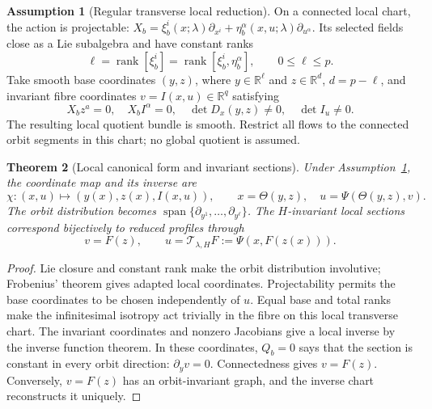 \documentclass[11pt]{article}
\newtheorem{theorem}{Theorem}[section]
\theoremstyle{definition}
\newtheorem{assumption}[theorem]{Assumption}
\begin{document}
\begin{assumption}[Regular transverse local reduction]
\label{ass:reduction-core}
On a connected local chart, the action is projectable:
$X_b=\xi_b^i(x;\lambda)\partial_{x^i}+\eta_b^\alpha(x,u;\lambda)\partial_{u^\alpha}$.
Its selected fields close as a Lie subalgebra and have constant ranks
\begin{equation}
 \ell=\operatorname{rank}[\xi_b^i]
      =\operatorname{rank}[\xi_b^i,\eta_b^\alpha],\qquad 0\le\ell\le p.
 \label{eq:fundamental-rank}
\end{equation}
Take smooth base coordinates $(y,z)$, where $y\in\mathbb R^\ell$ and
$z\in\mathbb R^d$, $d=p-\ell$, and invariant fibre coordinates
$v=I(x,u)\in\mathbb R^q$ satisfying
\begin{equation}
 X_bz^a=0,\quad X_bI^\alpha=0,\quad
 \det D_x(y,z)\ne0,\quad \det I_u\ne0.
 \label{eq:canonical-checks}
\end{equation}
The resulting local quotient bundle is smooth. Restrict all flows to the
connected orbit segments in this chart; no global quotient is assumed.
\end{assumption}

\begin{theorem}[Local canonical form and invariant sections]
\label{thm:canonical-core}
Under Assumption~\ref{ass:reduction-core}, the coordinate map and its inverse are
\begin{equation}
 \chi:(x,u)\longmapsto(y(x),z(x),I(x,u)),\qquad
 x=\Theta(y,z),\quad u=\Psi(\Theta(y,z),v).
 \label{eq:reduction-chart}
\end{equation}
The orbit distribution becomes $\operatorname{span}\{\partial_{y^1},\ldots,
\partial_{y^\ell}\}$. The $H$-invariant local sections correspond bijectively
to reduced profiles through
\begin{equation}
 v=F(z),\qquad
 u=\mathcal T_{\lambda,H}F:=\Psi(x,F(z(x))).
 \label{eq:fundamental-reconstruction}
\end{equation}
\end{theorem}
\begin{proof}
Lie closure and constant rank make the orbit distribution involutive;
Frobenius' theorem gives adapted local coordinates. Projectability permits
the base coordinates to be chosen independently of $u$. Equal base and total
ranks make the infinitesimal isotropy act trivially in the fibre on this
local transverse chart. The invariant coordinates and nonzero Jacobians give
a local inverse by the inverse function theorem. In these coordinates,
$Q_b=0$ says that the section is constant in every orbit direction:
$\partial_yv=0$. Connectedness gives $v=F(z)$. Conversely, $v=F(z)$ has an
orbit-invariant graph, and the inverse chart reconstructs it uniquely.
\end{proof}
\end{document}
